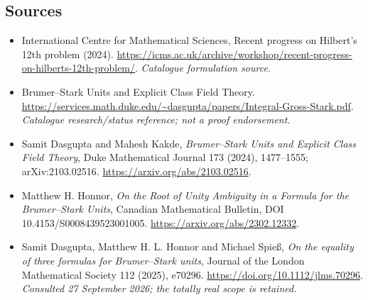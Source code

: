 \documentclass[11pt,a4paper]{article}
\numberwithin{equation}{section}
\begin{document}

\subsection{Sources}
\begin{itemize}\raggedright
\item[\textnormal{[S1]}]\hypertarget{source:45:1}{} International Centre for Mathematical Sciences, Recent progress on Hilbert's 12th problem (2024).
\url{https://icms.ac.uk/archive/workshop/recent-progress-on-hilberts-12th-problem/}.
{\small\textit{Catalogue formulation source.}}
\item[\textnormal{[S2]}]\hypertarget{source:45:2}{} Brumer–Stark Units and Explicit Class Field Theory.
\url{https://services.math.duke.edu/~dasgupta/papers/Integral-Gross-Stark.pdf}.
{\small\textit{Catalogue research/status reference; not a proof endorsement.}}
\item[\textnormal{[E1]}]\hypertarget{extra:45:1}{} Samit Dasgupta and Mahesh Kakde,
\emph{Brumer--Stark Units and Explicit Class Field Theory}, Duke Mathematical
Journal 173 (2024), 1477--1555; arXiv:2103.02516.
\url{https://arxiv.org/abs/2103.02516}.
\item[\textnormal{[E2]}]\hypertarget{extra:45:2}{} Matthew H. Honnor,
\emph{On the Root of Unity Ambiguity in a Formula for the Brumer--Stark Units},
Canadian Mathematical Bulletin, DOI 10.4153/S0008439523001005.
\url{https://arxiv.org/abs/2302.12332}.
\item[\textnormal{[E3]}]\hypertarget{extra:45:3}{} Samit Dasgupta, Matthew H. L. Honnor
and Michael Spie\ss, \emph{On the equality of three formulas for Brumer--Stark units},
Journal of the London Mathematical Society 112 (2025), e70296.
\url{https://doi.org/10.1112/jlms.70296}.
{\small\textit{Consulted 27 September 2026; the totally real scope is retained.}}

\end{itemize}

\end{document}
